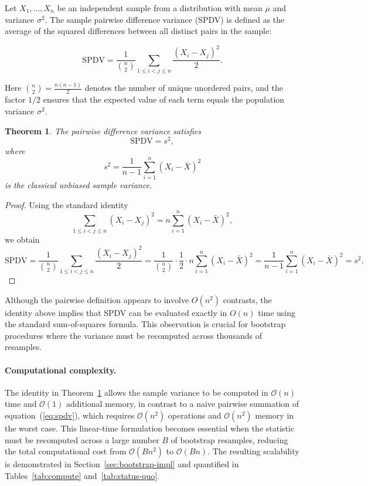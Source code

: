 \documentclass[12pt,a4paper]{article}
\newtheorem{theorem}{Theorem}
\begin{document}
Let $X_1,\ldots,X_n$ be an independent sample from a distribution with mean $\mu$ and variance $\sigma^2$. 
The sample pairwise difference variance (SPDV) is defined as the average of the squared differences 
between all distinct pairs in the sample:

\begin{equation}\label{eq:spdv}
\mathrm{SPDV} = \frac{1}{\binom{n}{2}} 
\sum_{1 \le i < j \le n} \frac{(X_i - X_j)^2}{2}.
\end{equation}

Here $\binom{n}{2} = \frac{n(n-1)}{2}$ denotes the number of unique unordered pairs, and the factor 
$1/2$ ensures that the expected value of each term equals the population variance $\sigma^2$.

\begin{theorem}\label{thm:spdv-identity}
The pairwise difference variance satisfies
\[
\mathrm{SPDV} = s^2,
\]
where
\[
s^2 = \frac{1}{n-1}\sum_{i=1}^n (X_i - \bar X)^2
\]
is the classical unbiased sample variance.
\end{theorem}

\begin{proof}
Using the standard identity
\[
\sum_{1 \le i < j \le n} (X_i - X_j)^2
= n \sum_{i=1}^n (X_i - \bar X)^2,
\]
we obtain
\[
\mathrm{SPDV}
= \frac{1}{\binom{n}{2}} \sum_{1 \le i < j \le n} \frac{(X_i - X_j)^2}{2}
= \frac{1}{\binom{n}{2}} \cdot \frac{1}{2} \cdot n \sum_{i=1}^n (X_i - \bar X)^2
= \frac{1}{n-1} \sum_{i=1}^n (X_i - \bar X)^2
= s^2.
\]
\end{proof}

Although the pairwise definition appears to involve $O(n^2)$ contrasts, the identity above implies that SPDV can be evaluated exactly in $O(n)$ time using the standard sum-of-squares formula. This observation is crucial for bootstrap procedures where the variance must be recomputed across thousands of resamples.

\paragraph{Computational complexity.}
The identity in Theorem~\ref{thm:spdv-identity} allows the sample variance to be computed in $\mathcal{O}(n)$ time and $\mathcal{O}(1)$ additional memory, in contrast to a naive pairwise summation of equation~(\ref{eq:spdv}), which requires $\mathcal{O}(n^2)$ operations and $\mathcal{O}(n^2)$ memory in the worst case. This linear-time formulation becomes essential when the statistic must be recomputed across a large number $B$ of bootstrap resamples, reducing the total computational cost from $\mathcal{O}(Bn^2)$ to $\mathcal{O}(Bn)$. The resulting scalability is demonstrated in Section~\ref{sec:bootstrap-impl} and quantified in Tables~\ref{tab:compute} and~\ref{tab:status-quo}.
\end{document}
